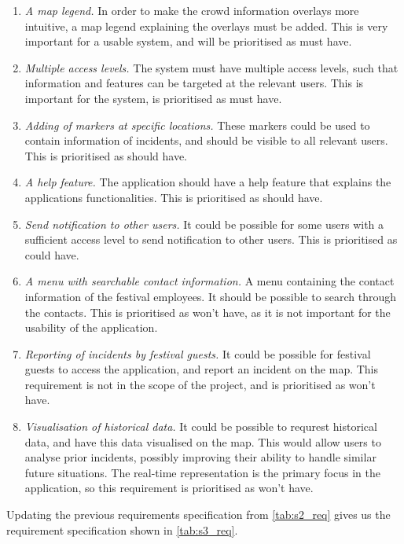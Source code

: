 \begin{enumerate}
    \item \emph{A map legend.} In order to make the crowd information overlays more intuitive, a map legend explaining the overlays must be added. This is very important for a usable system, and will be prioritised as must have.
    \item \emph{Multiple access levels.} The system must have multiple access levels, such that information and features can be targeted at the relevant users. This is important for the system, is prioritised as must have.
    \item \emph{Adding of markers at specific locations.} These markers could be used to contain information of incidents, and should be visible to all relevant users. This is prioritised as should have.
    \item \emph{A help feature.} The application should have a help feature that explains the applications functionalities. This is prioritised as should have.
    \item \emph{Send notification to other users.} It could be possible for some users with a sufficient access level to send notification to other users. This is prioritised as could have.
    \item \emph{A menu with searchable contact information.} A menu containing the contact information of the festival employees. It should be possible to search through the contacts. This is prioritised as won't have, as it is not important for the usability of the application.
    \item \emph{Reporting of incidents by festival guests.} It could be possible for festival guests to access the application, and report an incident on the map. This requirement is not in the scope of the project, and is prioritised as won't have.
    \item \emph{Visualisation of historical data.} It could be possible to requrest historical data, and have this data visualised on the map. This would allow users to analyse prior incidents, possibly improving their ability to handle similar future situations. The real-time representation is the primary focus in the application, so this requirement is prioritised as won't have.
\end{enumerate}

Updating the previous requirements specification from \cref{tab:s2_req} gives us the requirement specification shown in \cref{tab:s3_req}.

